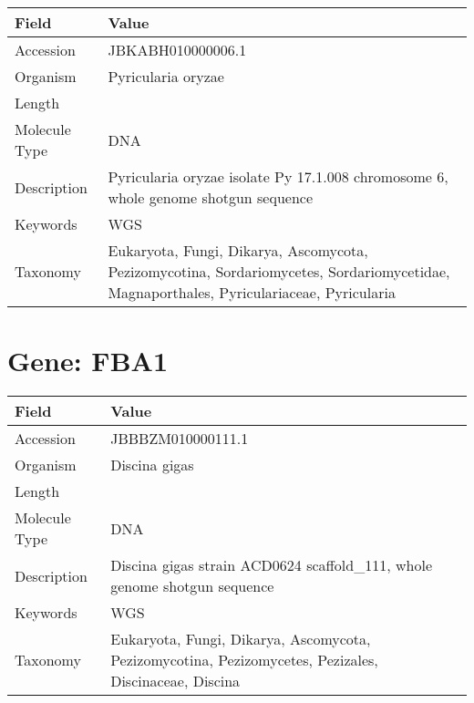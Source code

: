 \documentclass[10pt]{article}
\begin{document}
\vspace{1em}
{\footnotesize
\begin{longtable}{>{\raggedright\arraybackslash}p{4.5cm} >{\raggedright\arraybackslash}p{11.5cm}}
\textbf{Field} & \textbf{Value} \\
\hline
Accession & JBKABH010000006.1 \\
Organism & Pyricularia oryzae \\
Length & 6072652 \\
Molecule Type & DNA \\
Description & Pyricularia oryzae isolate Py 17.1.008 chromosome 6, whole genome shotgun sequence \\
Keywords & WGS \\
Taxonomy & Eukaryota, Fungi, Dikarya, Ascomycota, Pezizomycotina, Sordariomycetes, Sordariomycetidae, Magnaporthales, Pyriculariaceae, Pyricularia \\
\end{longtable}
}

\vspace{1em}
\section{Gene: FBA1}
{\footnotesize
\begin{longtable}{>{\raggedright\arraybackslash}p{4.5cm} >{\raggedright\arraybackslash}p{11.5cm}}
\textbf{Field} & \textbf{Value} \\
\hline
Accession & JBBBZM010000111.1 \\
Organism & Discina gigas \\
Length & 129430 \\
Molecule Type & DNA \\
Description & Discina gigas strain ACD0624 scaffold\_111, whole genome shotgun sequence \\
Keywords & WGS \\
Taxonomy & Eukaryota, Fungi, Dikarya, Ascomycota, Pezizomycotina, Pezizomycetes, Pezizales, Discinaceae, Discina \\
\end{longtable}
}

\vspace{1em}
\end{document}
